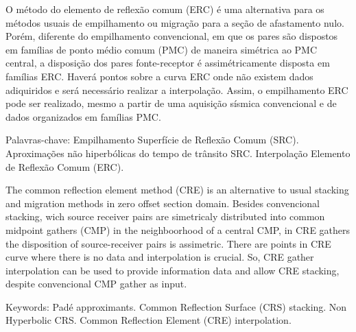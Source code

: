 \documentclass[
	12pt,				%
	openright,			%
	oneside,			%
	a4paper,			%
	english,			%
	brazil				%
	]{abntex2}
\begin{document}
\begin{resumo}
\OnehalfSpacing
O método do elemento de reflexão comum (ERC) é uma alternativa para os métodos
usuais de empilhamento ou migração para a seção de afastamento nulo. Porém, diferente do empilhamento 
convencional, em que os pares são dispostos em famílias de ponto médio comum (PMC) de maneira simétrica ao 
PMC central, a disposição dos pares fonte-receptor é assimétricamente disposta em famílias ERC. 
Haverá pontos sobre a curva ERC onde não existem dados adiquiridos e será necessário realizar a interpolação. 
Assim, o empilhamento ERC pode ser realizado, mesmo a partir de uma 
aquisição sísmica convencional e de dados organizados em famílias PMC.
 \vspace{\onelineskip} 
 \noindent
 \par Palavras-chave: Empilhamento Superfície de Reflexão Comum (SRC). Aproximações não hiperbólicas do tempo de trânsito SRC. 
 Interpolação Elemento de Reflexão Comum (ERC). 
\end{resumo}

\begin{resumo}
\OnehalfSpacing
The common reflection element method (CRE) is an alternative to usual stacking and migration methods 
in zero offset section domain. Besides convencional stacking, wich source receiver pairs are simetricaly distributed into common 
midpoint gathers (CMP) in the neighboorhood of a central CMP, in CRE gathers the disposition of 
source-receiver pairs is assimetric. There are points in CRE curve where there is no data and interpolation is crucial. 
So, CRE gather interpolation can be used to provide information data 
and allow CRE stacking, despite convencional CMP gather as input.
\vspace{\onelineskip} 
\noindent 
\par Keywords: Padé approximants. Common Reflection Surface (CRS) stacking. Non Hyperbolic CRS.
Common Reflection Element (CRE) interpolation.
\end{resumo}

\renewcommand{\listfigurename}{\fontsize{12pt}{\baselineskip}\textbf{LISTA DE ILUSTRAÇÕES}}
\pdfbookmark[0]{\listfigurename}{lof}
\listoffigures*

\cleardoublepage

\tableofcontents*

\cleardoublepage
 
\mainmatter
\end{document}
